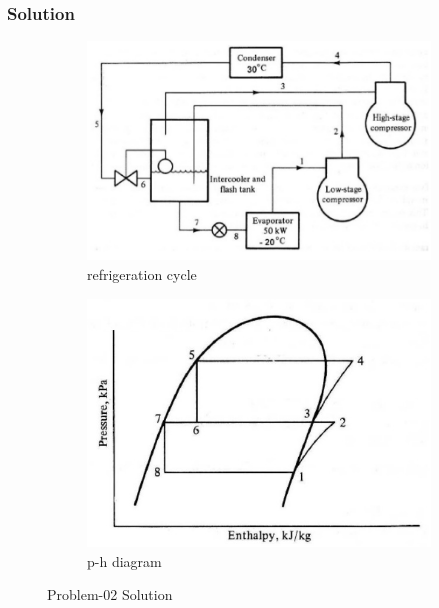 \documentclass{article}
\begin{document}
\subsubsection*{Solution}
\begin{figure}[h]
  \centering
  
  \begin{subfigure}{0.45\textwidth}
      \includegraphics[width=\textwidth]{img/prb-02.jpeg}
      \caption{refrigeration cycle}
      \label{subfig:refrigeration cycle}
  \end{subfigure}
  \hfill
  \begin{subfigure}{0.45\textwidth}
      \includegraphics[width=\textwidth]{img/prb-02a.jpeg}
      \caption{p-h diagram}
      \label{subfig:p-d diagram of problem 02}
  \end{subfigure}
  
  \caption{Problem-02 Solution}
  \label{fig:problem 02}
\end{figure}
\end{document}
